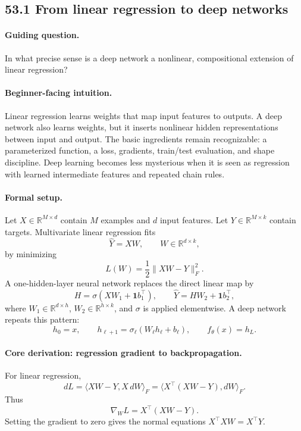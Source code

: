 \subsection{53.1 From linear regression to deep networks}

\paragraph{Guiding question.}
In what precise sense is a deep network a nonlinear, compositional extension of linear regression?

\paragraph{Beginner-facing intuition.}
Linear regression learns weights that map input features to outputs. A deep network also learns weights, but it inserts nonlinear hidden representations between input and output. The basic ingredients remain recognizable: a parameterized function, a loss, gradients, train/test evaluation, and shape discipline. Deep learning becomes less mysterious when it is seen as regression with learned intermediate features and repeated chain rules.

\paragraph{Formal setup.}
Let \(X\in\mathbb R^{M\times d}\) contain \(M\) examples and \(d\) input features. Let \(Y\in\mathbb R^{M\times k}\) contain targets. Multivariate linear regression fits
\[
\widehat Y=XW,\qquad W\in\mathbb R^{d\times k},
\]
by minimizing
\[
L(W)=\frac{1}{2}\|XW-Y\|_F^2.
\]
A one-hidden-layer neural network replaces the direct linear map by
\[
H=\sigma(XW_1+\mathbf 1 b_1^\top),\qquad
\widehat Y=HW_2+\mathbf 1 b_2^\top,
\]
where \(W_1\in\mathbb R^{d\times h}\), \(W_2\in\mathbb R^{h\times k}\), and \(\sigma\) is applied elementwise. A deep network repeats this pattern:
\[
h_0=x,\qquad h_{\ell+1}=\sigma_\ell(W_\ell h_\ell+b_\ell),\qquad f_\theta(x)=h_L.
\]

\paragraph{Core derivation: regression gradient to backpropagation.}
For linear regression,
\[
dL=\langle XW-Y, X\,dW\rangle_F
=\langle X^\top(XW-Y),dW\rangle_F.
\]
Thus
\[
\boxed{\nabla_W L=X^\top(XW-Y).}
\]
Setting the gradient to zero gives the normal equations \(X^\top XW=X^\top Y\).

